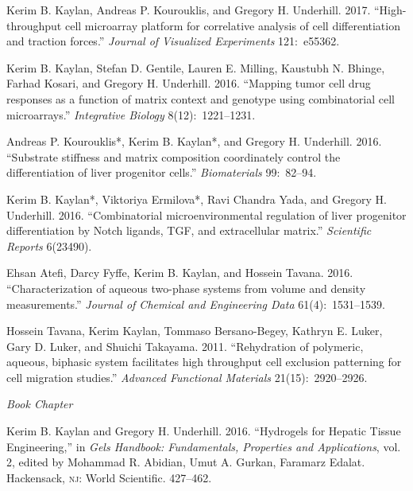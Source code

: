 \documentclass[11pt,article,oneside]{memoir}
\begin{document}
\ind Kerim B. Kaylan, Andreas P. Kourouklis, and Gregory H. Underhill. 2017. ``High-throughput cell microarray platform for correlative analysis of cell differentiation and traction forces.'' \emph{Journal of Visualized Experiments} 121:~e55362.

\ind Kerim B. Kaylan, Stefan D. Gentile, Lauren E. Milling, Kaustubh N. Bhinge, Farhad Kosari, and Gregory H. Underhill. 2016. ``Mapping tumor cell drug responses as a function of matrix context and genotype using combinatorial cell microarrays.'' \emph{Integrative Biology} 8(12):~1221--1231.

\ind Andreas P. Kourouklis*, Kerim B. Kaylan*, and Gregory H. Underhill. 2016. ``Substrate stiffness and matrix composition coordinately control the differentiation of liver progenitor cells.'' \emph{Biomaterials} 99:~82--94.

\ind Kerim B. Kaylan*, Viktoriya Ermilova*, Ravi Chandra Yada, and Gregory H. Underhill. 2016. ``Combinatorial microenvironmental regulation of liver progenitor differentiation by Notch ligands, TGF\textbeta, and extracellular matrix.'' \emph{Scientific Reports} 6(23490).

\ind Ehsan Atefi, Darcy Fyffe, Kerim B. Kaylan, and Hossein Tavana. 2016. ``Characterization of aqueous two-phase systems from volume and density measurements.'' \emph{Journal of Chemical and Engineering Data} 61(4):~1531--1539.

\ind Hossein Tavana, Kerim Kaylan, Tommaso Bersano-Begey, Kathryn E. Luker, Gary D. Luker, and Shuichi Takayama. 2011. ``Rehydration of polymeric, aqueous, biphasic system facilitates high throughput cell exclusion patterning for cell migration studies.'' \emph{Advanced Functional Materials} 21(15):~2920--2926.


\bigskip

\noindent\textit{Book Chapter \vspace{0.05in}}

\ind Kerim B. Kaylan and Gregory H. Underhill. 2016. ``Hydrogels for Hepatic Tissue Engineering,'' in \emph{Gels Handbook: Fundamentals, Properties and Applications}, vol. 2, edited by Mohammad R. Abidian, Umut A. Gurkan, Faramarz Edalat. Hackensack, \textsc{nj}: World Scientific. 427--462.

\end{document}
